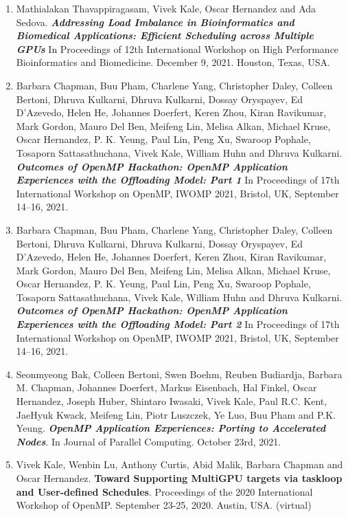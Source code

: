 \begin{enumerate}
\item Mathialakan Thavappiragasam, Vivek Kale, Oscar Hernandez and  Ada Sedova. \textbf{\textit{Addressing Load Imbalance in Bioinformatics and Biomedical Applications: Efficient Scheduling across Multiple GPUs}} In Proceedings of 12th International Workshop on High Performance Bioinformatics and Biomedicine. December 9, 2021. Houston, Texas, USA. 
\item Barbara Chapman, Buu Pham, Charlene Yang, Christopher Daley, Colleen Bertoni, Dhruva Kulkarni, Dhruva Kulkarni, Dossay Oryspayev, Ed D’Azevedo, Helen He, Johannes Doerfert, Keren Zhou, Kiran Ravikumar, Mark Gordon, Mauro Del Ben, Meifeng Lin, Melisa Alkan, Michael Kruse, Oscar Hernandez, P. K. Yeung, Paul Lin, Peng Xu, Swaroop Pophale, Tosaporn Sattasathuchana, Vivek Kale, William Huhn and Dhruva Kulkarni. \textbf{\textit{Outcomes of OpenMP Hackathon: OpenMP Application Experiences with the Offloading Model: Part 1}} In Proceedings of 17th International Workshop on OpenMP, IWOMP 2021, Bristol, UK, September 14–16, 2021.

\item Barbara Chapman, Buu Pham, Charlene Yang, Christopher Daley, Colleen Bertoni, Dhruva Kulkarni, Dhruva Kulkarni, Dossay Oryspayev, Ed D’Azevedo, Helen He, Johannes Doerfert, Keren Zhou, Kiran Ravikumar, Mark Gordon, Mauro Del Ben, Meifeng Lin, Melisa Alkan, Michael Kruse, Oscar Hernandez, P. K. Yeung, Paul Lin, Peng Xu, Swaroop Pophale, Tosaporn Sattasathuchana, Vivek Kale, William Huhn and Dhruva Kulkarni. \textbf{\textit{Outcomes of OpenMP Hackathon: OpenMP Application Experiences with the Offloading Model: Part 2}} In Proceedings of 17th International Workshop on OpenMP, IWOMP 2021, Bristol, UK, September 14–16, 2021. 

\item Seonmyeong Bak, Colleen Bertoni, Swen Boehm, Reuben Budiardja, Barbara M. Chapman, Johannes Doerfert, Markus Eisenbach, Hal Finkel, Oscar Hernandez, Joseph Huber, Shintaro Iwasaki, Vivek Kale, Paul R.C. Kent, JaeHyuk Kwack, Meifeng Lin, Piotr Luszczek, Ye Luo, Buu Pham and P.K. Yeung. \textbf{\textit{OpenMP Application Experiences: Porting to Accelerated Nodes}}.  In Journal of Parallel Computing. October 23rd, 2021.

\item Vivek Kale, Wenbin Lu, Anthony Curtis, Abid Malik, Barbara Chapman and Oscar Hernandez. \textbf{\textbf{Toward Supporting MultiGPU targets via taskloop and User-defined Schedules}}. Proceedings of the 2020 International Workshop of OpenMP. September 23-25, 2020. Austin, USA. (virtual) 


\end{enumerate}
